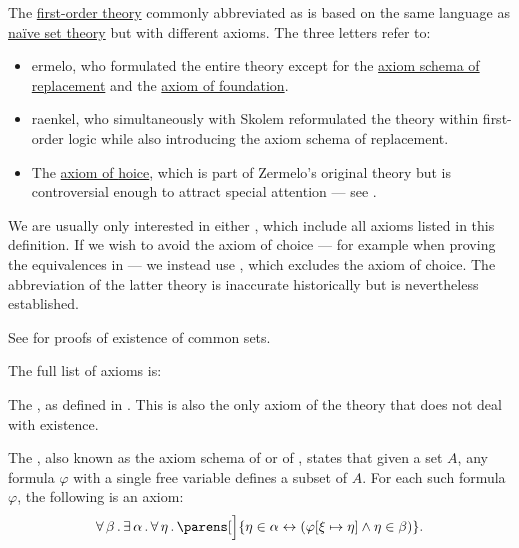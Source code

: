 \begin{definition}\label{def:zfc}
  The \hyperref[def:first_order_theory]{first-order theory} commonly abbreviated as  is based on the same language as \hyperref[def:naive_set_theory]{na\"ive set theory} but with different axioms. The three letters refer to:
  \begin{itemize}
    \item \textbf{}ermelo, who formulated the entire theory except for the \hyperref[def:zfc/replacement]{axiom schema of replacement} and the \hyperref[def:zfc/foundation]{axiom of foundation}.
    \item{} \textbf{}raenkel, who simultaneously with Skolem reformulated the theory within first-order logic while also introducing the axiom schema of replacement.
    \item The \hyperref[def:zfc/choice]{axiom of \textbf{}hoice}, which is part of Zermelo's original theory but is controversial enough to attract special attention --- see .
  \end{itemize}

  We are usually only interested in either , which include all axioms listed in this definition. If we wish to avoid the axiom of choice --- for example when proving the equivalences in  --- we instead use , which excludes the axiom of choice. The abbreviation of the latter theory is inaccurate historically but is nevertheless established.

  See  for proofs of existence of common sets.

  The full list of axioms is:
  \begin{thmenum}
     The , as defined in . This is also the only axiom of the theory that does not deal with existence.

     The , also known as the axiom schema of  or of , states that given a set \( A \), any formula \( \varphi \) with a single free variable defines a subset of \( A \). For each such formula \( \varphi \), the following is an axiom:
    \begin{equation}\label{eq:def:zfc/specification}
      \qforall \beta \qexists \alpha \qforall \eta \parens[\Big]{ \eta \in \alpha \leftrightarrow (\varphi[\xi \mapsto \eta] \wedge \eta \in \beta) }.
    \end{equation}


\end{thmenum}
\end{definition}
